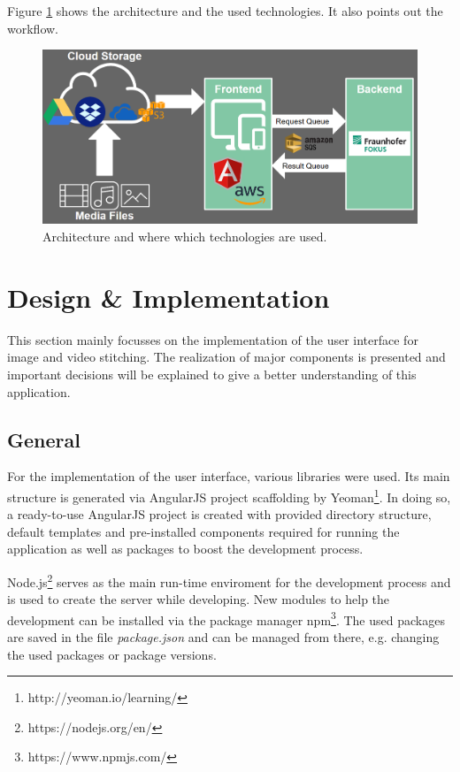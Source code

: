 \documentclass[conference]{IEEEtran}
\begin{document}
Figure \ref{fig:architecture} shows the architecture and the used technologies.
It also points out the workflow.

\begin{figure}[H]
	\centering
	\includegraphics[scale=0.27]{architecture.png}
	\caption{Architecture and where which technologies are used.}
	\label{fig:architecture}
\end{figure}

\section{Design \& Implementation}
This section mainly focusses on the implementation of the user interface for image and video stitching.
The realization of major components is presented and important decisions will be explained to give a better understanding of this application.

\subsection{General}
For the implementation of the user interface, various libraries were used.
Its main structure is generated via AngularJS project scaffolding by Yeoman\footnote{http://yeoman.io/learning/}.
In doing so, a ready-to-use AngularJS project is created with provided directory structure, default templates and pre-installed components required for running the application as well as packages to boost the development process.

Node.js\footnote{https://nodejs.org/en/} serves as the main run-time enviroment for the development process and is used to create the server while developing.
New modules to help the development can be installed via the package manager npm\footnote{https://www.npmjs.com/}.
The used packages are saved in the file \textit{package.json} and can be managed from there, e.g. changing the used packages or package versions.
\end{document}
